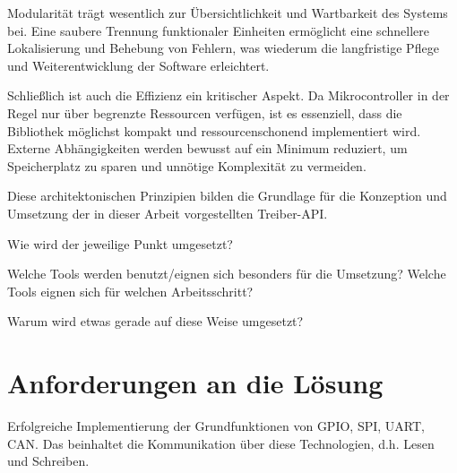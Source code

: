 Modularität trägt wesentlich zur Übersichtlichkeit und Wartbarkeit des Systems bei. 
Eine saubere Trennung funktionaler Einheiten ermöglicht eine schnellere Lokalisierung und Behebung von Fehlern, was wiederum die langfristige Pflege und Weiterentwicklung der Software erleichtert.

Schließlich ist auch die Effizienz ein kritischer Aspekt.
Da Mikrocontroller in der Regel nur über begrenzte Ressourcen verfügen, ist es essenziell, dass die Bibliothek möglichst kompakt und ressourcenschonend implementiert wird. 
Externe Abhängigkeiten werden bewusst auf ein Minimum reduziert, um Speicherplatz zu sparen und unnötige Komplexität zu vermeiden.

Diese architektonischen Prinzipien bilden die Grundlage für die Konzeption und Umsetzung der in dieser Arbeit vorgestellten Treiber-API.

Wie wird der jeweilige Punkt umgesetzt?

Welche Tools werden benutzt/eignen sich besonders für die Umsetzung?
Welche Tools eignen sich für welchen Arbeitsschritt?

Warum wird etwas gerade auf diese Weise umgesetzt?


\section{Anforderungen an die Lösung}
Erfolgreiche Implementierung der Grundfunktionen 
von GPIO, SPI, UART, CAN. Das beinhaltet die Kommunikation über diese Technologien, d.h. Lesen und Schreiben.



